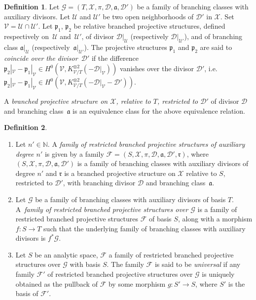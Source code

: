 \documentclass[10pt]{amsart}
\newcommand{\ie}{i.e.}
\newcommand{\skpt}{\par\smallskip}
\newcommand{\N}{\mathbb N}
\theoremstyle{definition}
\newtheorem{definition}{Definition}[subsection]
\theoremstyle{plain}
\begin{document}
\begin{definition}
Let $\mathcal G = (T, \mathcal X, \pi, \mathcal D, \mathfrak a, \mathcal D')$ be a family of branching classes with auxiliary divisors.
Let $\mathcal U$ and $\mathcal U'$ be two open neighborhoods of $\mathcal D'$ in $\mathcal X$.
Set $\mathcal V = \mathcal U \cap \mathcal U'$.
Let $\mathfrak p_1$, $\mathfrak p_2$ be relative branched projective structures, defined respectively on~$\mathcal U$ and~$\mathcal U'$, of divisor $\mathcal D|_{\mathcal U}$ (respectively $\mathcal D|_{\mathcal U'}$), and of branching class $\mathfrak a|_{\mathcal U}$ (respectively~$\mathfrak a|_{\mathcal U'}$).
The projective structures $\mathfrak p_1$ and $\mathfrak p_2$ are said to \emph{coincide over the divisor~$\mathcal D'$} if the difference $\mathfrak p_2|_{\mathcal V} - \mathfrak p_1|_{\mathcal V} \in H^0(\mathcal V, K_{\mathcal V/T}^{\otimes 2}(-\mathcal D|_{\mathcal V}))$ vanishes over the divisor $\mathcal D'$, \ie \hbox{$\mathfrak p_2|_{\mathcal V}-\mathfrak p_1|_{\mathcal V} \in H^0(\mathcal V, K_{\mathcal V/T}^{\otimes 2}(-\mathcal D|_{\mathcal V}- \mathcal D'))$}.

A \emph{branched projective structure on $\mathcal X$, relative to $T$, restricted to $\mathcal D'$} of divisor $\mathcal D$ and branching class~$\mathfrak a$ is an equivalence class for the above equivalence relation.
\end{definition}

\skpt
\begin{definition}\label{definition_families_rbps}
\begin{enumerate}
\item
Let $n' \in \N$.
A \emph{family of restricted branched projective structures of auxiliary degree $n'$} is given by a family $\mathcal F = (S, \mathcal X, \pi, \mathcal D, \mathfrak a, \mathcal D', \mathfrak r)$, where $(S, \mathcal X, \pi, \mathcal D, \mathfrak a, \mathcal D')$ is a family of branching classes with auxiliary divisors of degree $n'$ and $\mathfrak r$ is a branched projective structure on $\mathcal X$ relative to $S$, restricted to $\mathcal D'$, with branching divisor $\mathcal D$ and branching class~$\mathfrak a$.
\item
Let $\mathcal G$ be a family of branching classes with auxiliary divisors of basis $T$.
A~\emph{family of restricted branched projective structures over $\mathcal G$} is a family of restricted branched projective structures $\mathcal F$ of basis $S$, along with a morphism $f: S \to T$ such that the underlying family of branching classes with auxiliary divisors is $f^*\mathcal G$.
\item[(iii)]
Let $S$ be an analytic space, $\mathcal F$ a family of restricted branched projective structures over $\mathcal G$ with basis $S$.
The family $\mathcal F$ is said to be \emph{universal} if any family $\mathcal F'$ of restricted branched projective structures over $\mathcal G$ is uniquely obtained as the pullback of $\mathcal F$ by some morphism $g: S' \to S$, where $S'$ is the basis of $\mathcal F'$.
\end{enumerate}
\end{definition}
\end{document}
